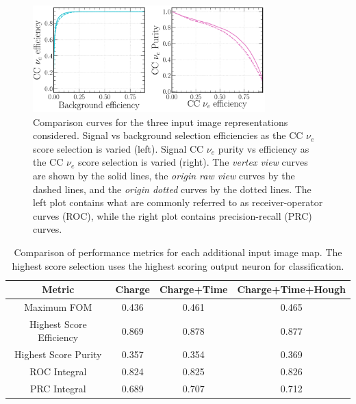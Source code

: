 \begin{figure} %
    \includegraphics[width=0.8\textwidth]{diagrams/6-cvn/chipsnet/repr_nuel_comp_curves.pdf}
    \caption[Comparison curves for the three input image representations considered.]
    {Comparison curves for the three input image representations considered. Signal vs background
        selection efficiencies as the CC $\nu_{e}$ score selection is varied (left). Signal CC
        $\nu_{e}$ purity vs efficiency as the CC $\nu_{e}$ score selection is varied (right). The
        \emph{vertex view} curves are shown by the solid lines, the \emph{origin raw view} curves
        by the dashed lines, and the \emph{origin dotted} curves by the dotted lines. The left
        plot contains what are commonly referred to as receiver-operator curves (ROC), while the
        right plot contains precision-recall (PRC) curves.}
    \label{fig:repr_nuel_comp_curves}
\end{figure}

\begin{table}
    \begin{tabular}{cccc}
        Metric                   & Charge & Charge+Time & Charge+Time+Hough \\
        \midrule
        Maximum FOM              & 0.436  & 0.461       & 0.465             \\
        Highest Score Efficiency & 0.869  & 0.878       & 0.877             \\
        Highest Score Purity     & 0.357  & 0.354       & 0.369             \\
        ROC Integral             & 0.824  & 0.825       & 0.826             \\
        PRC Integral             & 0.689  & 0.707       & 0.712             \\
    \end{tabular}
    \caption[Comparison of performance metrics for each additional input image map.]
    {Comparison of performance metrics for each additional input image map. The highest score
        selection uses the highest scoring output neuron for classification.}
    \label{tab:chan}
\end{table}

